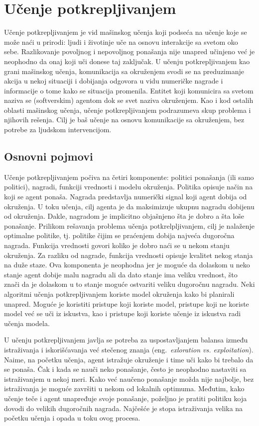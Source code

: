 \chapter{Učenje potkrepljivanjem}
\label{ch:rl}

Učenje potkrepljivanjem je vid mašinskog učenja koji podseća na učenje koje se može naći u prirodi: ljudi i životinje uče na osnovu interakcije sa svetom oko sebe. Razlikovanje povoljnog i nepovoljnog ponašanja nije unapred učinjeno već je neophodno da onaj koji uči donese taj zaključak. U učenju potkrepljivanjem kao grani mašinskog učenja, komunikacija sa okruženjem svodi se na preduzimanje akcija u nekoj situaciji i dobijanja odgovora u vidu numeričke nagrade i informacije o tome kako se situacija promenila. Entitet koji komunicira sa svetom naziva se (softverskim) agentom dok se svet naziva okruženjem. Kao i kod ostalih oblasti mašinskog učenja, učenje potkrepljivanjem podrazumeva skup problema i njihovih rešenja. Cilj je baš učenje na osnovu komunikacije sa okruženjem, bez potrebe za ljudskom intervencijom.

\section{Osnovni pojmovi}

Učenje potkrepljivanjem počiva na četiri komponente: politici ponašanja (ili samo politici), nagradi, funkciji vrednosti i modelu okruženja. Politika opisuje način na koji se agent ponaša. Nagrada predstavlja numerički signal koji agent dobija od okruženja. U toku učenja, cilj agenta je da maksimizuje ukupnu nagradu dobijenu od okruženja. Dakle, nagradom je implicitno objašnjeno šta je dobro a šta loše ponašanje. Prilikom rešavanja problema učenja potkrelpljivanjem, cilj je nalaženje optimalne politike, tj. politike čijim se praćenjem dobija najveća dugoročna nagrada. Funkcija vrednosti govori koliko je dobro naći se u nekom stanju okruženja. Za razliku od nagrade, funkcija vrednosti opisuje kvalitet nekog stanja na duže staze. Ova komponenta je neophodna jer je moguće da dolaskom u neko stanje agent dobije malu nagradu ali da dato stanje ima veliku vrednost, što znači da je dolaskom u to stanje moguće ostvariti veliku dugoročnu nagradu. Neki algoritmi učenja potkrepljivanjem koriste model okruženja kako bi planirali unapred. Moguće je koristiti pristupe koji koriste model, pristupe koji ne koriste model već se uči iz iskustva, kao i pristupe koji koriste učenje iz iskustva radi učenja modela.
\par 
U učenju potkrepljivanjem javlja se potreba za uspostavljanjem balansa između istraživanja i iskorišćavanja već stečenog znanja (eng.~{\em exloration vs. exploitation}). Naime, na početku učenja, agent istražuje okruženje i time uči kako bi trebalo da se ponaša. Čak i kada se nauči neko ponašanje, često je neophodno nastaviti sa istraživanjem u nekoj meri. Kako već naučeno ponašanje možda nije najbolje, bez istraživanja je moguće završiti u nekom od lokalnih optimuma. Međutim, kako učenje teče i agent unapređuje svoje ponašanje, poželjno je pratiti politiku koja dovodi do velikih dugoročnih nagrada. Najčešće je stopa istraživanja velika na početku učenja i opada u toku ovog procesa.

